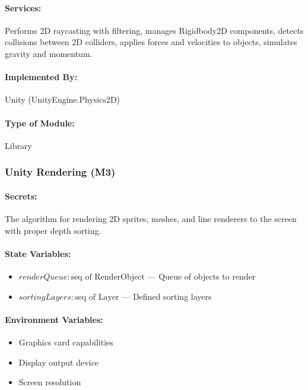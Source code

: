 \documentclass[12pt, titlepage]{article}
\begin{document}
\paragraph{Services:}
Performs 2D raycasting with filtering, manages Rigidbody2D components, detects collisions between 2D colliders, applies forces and velocities to objects, simulates gravity and momentum.

\paragraph{Implemented By:}
Unity (UnityEngine.Physics2D)

\paragraph{Type of Module:}
Library

\vspace{10mm}

\subsubsection{Unity Rendering (M3)} \label{M3}

\paragraph{Secrets:}
The algorithm for rendering 2D sprites, meshes, and line renderers to the screen with proper depth sorting.

\paragraph{State Variables:}
\begin{itemize}
\item $renderQueue : \text{seq of RenderObject}$ --- Queue of objects to render
\item $sortingLayers : \text{seq of Layer}$ --- Defined sorting layers
\end{itemize}

\paragraph{Environment Variables:}
\begin{itemize}
\item Graphics card capabilities
\item Display output device
\item Screen resolution
\end{itemize}
\end{document}
